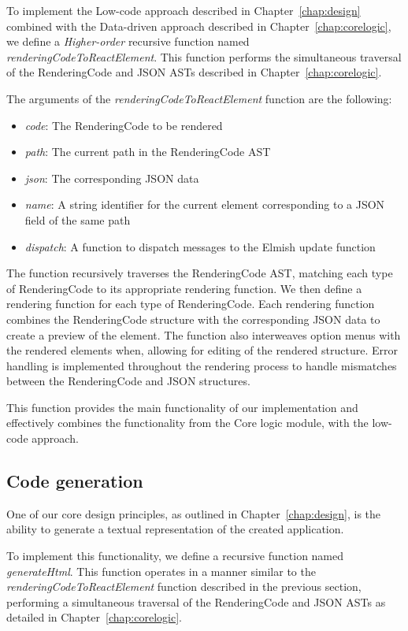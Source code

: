 To implement the Low-code approach described in Chapter~\ref{chap:design} combined with the Data-driven approach described in Chapter~\ref{chap:corelogic},
we define a \emph{Higher-order} recursive function named \emph{renderingCodeToReactElement}.
This function performs the simultaneous traversal of the RenderingCode and JSON ASTs described in Chapter~\ref{chap:corelogic}.

The arguments of the \emph{renderingCodeToReactElement} function are the following:
\begin{itemize}
	\item \emph{code}: The RenderingCode to be rendered
	\item \emph{path}: The current path in the RenderingCode AST
	\item \emph{json}: The corresponding JSON data
	\item \emph{name}: A string identifier for the current element corresponding to a JSON field of the same path
	\item \emph{dispatch}: A function to dispatch messages to the Elmish update function
\end{itemize}

The function recursively traverses the RenderingCode AST, matching each type of RenderingCode to its appropriate rendering function.
We then define a rendering function for each type of RenderingCode.
Each rendering function combines the RenderingCode structure with the corresponding JSON data to create a preview of the element.
The function also interweaves option menus with the rendered elements when, allowing for editing of the rendered structure.
Error handling is implemented throughout the rendering process to handle mismatches between the RenderingCode and JSON structures.

This function provides the main functionality of our implementation and effectively combines the functionality from the Core logic module,
with the low-code approach.

\subsection{Code generation}

One of our core design principles, as outlined in Chapter~\ref{chap:design},
is the ability to generate a textual representation of the created application.

To implement this functionality, we define a recursive function named \emph{generateHtml}.
This function operates in a manner similar to the \emph{renderingCodeToReactElement} function described in the previous section,
performing a simultaneous traversal of the RenderingCode and JSON ASTs as detailed in Chapter~\ref{chap:corelogic}.

